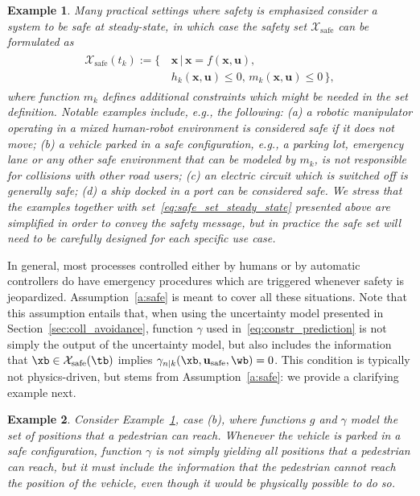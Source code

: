 \documentclass[journal]{IEEEtran}
\newcommand{\x}{{\mathbf{x}}}
\renewcommand{\u}{{\mathbf{u}}}
\newcommand{\review}[1]{#1}
\newtheorem{Example}{Example}
\begin{document}
	\begin{Example}\label{ex:safe_set}
	\review{Many practical settings where safety is emphasized consider a system to be safe at  steady-state, in which case the safety set $\mathcal{X}_\mathrm{safe}$  can be formulated as}
	\review{\begin{align}
	\label{eq:safe_set_steady_state}
	\begin{split}
	\mathcal{X}_\mathrm{safe}(t_k):=\{ \, & \x \, | \, \x = f(\x,\u),\\
	&h_{k}(\x,\u) \leq 0, \, m_{k}(\x,\u) \leq 0 \, \},
	\end{split}
	\end{align}}
	where function $m_k$ defines additional constraints which might be needed in the set definition. Notable examples include, e.g., the following: (a) a robotic manipulator operating in a mixed human-robot environment is considered safe if it does not move; (b) a \review{vehicle parked in a safe configuration, e.g., a parking lot, emergency lane or any other safe environment that can be modeled by $m_k$}, is not responsible for collisions with other road users; (c) an electric circuit which is switched off is generally safe; (d) a ship docked in a port can be considered safe. We stress that the examples \review{together with set~\eqref{eq:safe_set_steady_state} presented above} are simplified in order to convey the safety message, but in practice the safe set will need to be carefully designed for each specific use case. 
	\end{Example}

	In general, most processes controlled either by humans or by automatic controllers do have emergency procedures which are triggered whenever safety is jeopardized. Assumption~\ref{a:safe} is meant to cover all these situations. 
	Note that this assumption entails that, when using the uncertainty model presented in Section~\ref{sec:coll_avoidance}, function $\gamma$ used in~\eqref{eq:constr_prediction} is not simply the output of the uncertainty model, but also includes the information that $\xb\in \mathcal{X}_\mathrm{safe}(\tb)$ implies $\gamma_{n|k}(\xb,\u_\mathrm{safe},\wb)=0$. This condition is typically not physics-driven, but stems from Assumption~\ref{a:safe}: we provide a clarifying example next.
		\begin{Example}
			Consider Example~\ref{ex:safe_set}, case (b), where functions $g$ and $\gamma$ model the set of positions that a pedestrian can reach. Whenever the vehicle is parked \review{in a safe configuration}, function $\gamma$ is not simply yielding all positions that a pedestrian can reach, but it must include the information that the pedestrian cannot reach the position of the vehicle, even though it would be physically possible to do so.
		\end{Example}
	
\end{document}
